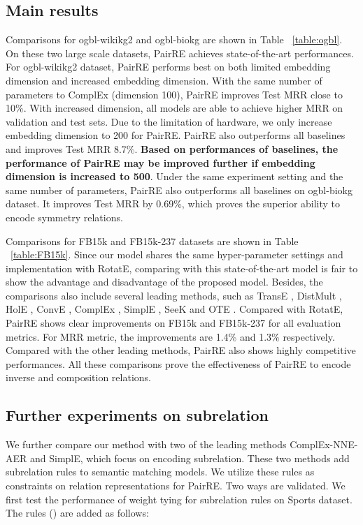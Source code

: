 \documentclass[11pt,a4paper]{article}
\begin{document}
\subsection{Main results}

Comparisons for ogbl-wikikg2 and ogbl-biokg are shown in Table ~\ref{table:ogbl}. On these two large scale datasets, PairRE achieves state-of-the-art performances.
For ogbl-wikikg2 dataset, PairRE performs best on both limited embedding dimension and increased embedding dimension.
With the same number of parameters to ComplEx (dimension 100), PairRE improves Test MRR close to 10\%.
With increased dimension, all models are able to achieve higher MRR on validation and test sets.
Due to the limitation of hardware, we only increase embedding dimension to 200 for PairRE.
PairRE also outperforms all baselines and improves Test MRR 8.7\%.
\textbf{Based on performances of baselines, the performance of PairRE may be improved further if embedding dimension is increased to 500}.
Under the same experiment setting and the same number of parameters, PairRE also outperforms all baselines on ogbl-biokg  dataset.
It improves Test MRR by 0.69\%, which proves the superior ability to encode symmetry relations.

Comparisons for FB15k and FB15k-237 datasets are shown in Table ~\ref{table:FB15k}.
Since our model shares the same hyper-parameter settings and implementation with RotatE, comparing with this state-of-the-art model is fair to show the advantage and disadvantage of the proposed model.
Besides, the comparisons also include several leading methods, such as TransE \cite{bordes2013translating}, DistMult \cite{yang2014embedding}, HolE \cite{nickel2016holographic}, ConvE \cite{dettmers2018convolutional}, ComplEx \cite{trouillon2016complex}, SimplE \cite{kazemi2018simple}, SeeK \cite{xu2020seek} and OTE \cite{tang2019orthogonal}.
Compared with RotatE, PairRE shows clear improvements on FB15k and FB15k-237 for all evaluation metrics.
For MRR metric, the improvements are 1.4\% and 1.3\% respectively.
Compared with the other leading methods, PairRE also shows highly competitive performances.
All these comparisons prove the effectiveness of PairRE to encode inverse and composition relations.

\subsection{Further experiments on subrelation}

We further compare our method with two of the leading methods ComplEx-NNE-AER and SimplE, which focus on encoding subrelation.
These two methods add subrelation rules to semantic matching models.
We utilize these rules as constraints on relation representations for PairRE.
Two ways are validated.
We first test the performance of weight tying for subrelation rules on Sports dataset.
The rules () are added as follows:
\end{document}
